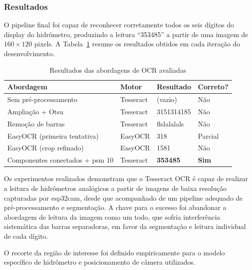 \subsubsection{Resultados}

O pipeline final foi capaz de reconhecer corretamente todos os seis dígitos do display do hidrômetro, produzindo a leitura ``353485'' a partir de uma imagem de $160 \times 120$ pixels. A Tabela~\ref{tab:ocr_resultados} resume os resultados obtidos em cada iteração do desenvolvimento.

\begin{table}[h]
\centering
\caption{Resultados das abordagens de OCR avaliadas}
\label{tab:ocr_resultados}
\begin{tabular}{llll}
\hline
\textbf{Abordagem} & \textbf{Motor} & \textbf{Resultado} & \textbf{Correto?} \\
\hline
Sem pré-processamento           & Tesseract & (vazio)         & Não \\
Ampliação + Otsu                & Tesseract & 3151314185      & Não \\
Remoção de barras               & Tesseract & flslalalals     & Não \\
EasyOCR (primeira tentativa)    & EasyOCR   & 318             & Parcial \\
EasyOCR (crop refinado)         & EasyOCR   & 1581            & Não \\
Componentes conectados + psm 10 & Tesseract & \textbf{353485} & \textbf{Sim} \\
\hline
\end{tabular}
\end{table}

Os experimentos realizados demonstram que o Tesseract OCR é capaz de realizar a leitura de hidrômetros analógicos a partir de imagens de baixa resolução capturadas por \gls{esp32cam}, desde que acompanhado de um pipeline adequado de pré-processamento e segmentação. A chave para o sucesso foi abandonar a abordagem de leitura da imagem como um todo, que sofria interferência sistemática das barras separadoras, em favor da segmentação e leitura individual de cada dígito.

O recorte da região de interesse foi definido empiricamente para o modelo específico de hidrômetro e posicionamento de câmera utilizados.

